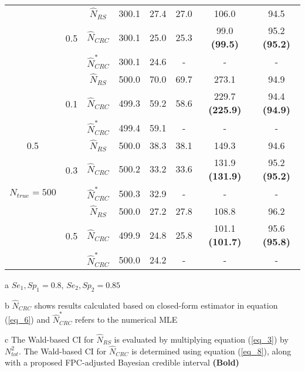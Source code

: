 \documentclass[useAMS,usenatbib,referee]{biom}
\begin{document}
\begin{table}
\begin{threeparttable}[b]
\begin{tabular}{|c|c|c|c|c|c|c|c|}
     & \multirow{3}{*}{0.5}  & $\hat{N}_{RS}$ & 300.1 & 27.4 & 27.0 & 106.0 & 94.5    \\ \cline{3-8}
     & ~ & $\hat{N}_{CRC}$ & 300.1 & 25.0 & 25.3 & 99.0 \textbf{(99.5)} & 95.2 \textbf{(95.2)}   \\ \cline{3-8}
    ~ & ~ & $\hat{N}_{CRC}^*$ & 300.1 & 24.6  & - & - & -   \\ \hline
    
    & \multirow{3}{*}{0.1} & $\hat{N}_{RS}$ & 500.0 & 70.0 & 69.7 & 273.1 & 94.9  \\ \cline{3-8}
     & ~ & $\hat{N}_{CRC}$ &  499.3 & 59.2 & 58.6 & 229.7 \textbf{(225.9)} & 94.4 \textbf{(94.9)}   \\ \cline{3-8}
    ~ & ~ & $\hat{N}_{CRC}^*$ & 499.4 & 59.1 & - & - & -   \\ \cline{2-8}
    
    0.5 & \multirow{3}{*}{0.3} & $\hat{N}_{RS}$ & 500.0 & 38.3 & 38.1 & 149.3 & 94.6   \\ \cline{3-8}
     & ~ & $\hat{N}_{CRC}$ &  500.2 & 33.2 & 33.6 & 131.9 \textbf{(131.9)} & 95.2 \textbf{(95.2)}  \\ \cline{3-8}
    $N_{true}=500$ & ~ & $\hat{N}_{CRC}^*$ & 500.3 & 32.9 & - & - & -   \\ \cline{2-8}
    
     & \multirow{3}{*}{0.5}  & $\hat{N}_{RS}$ & 500.0 & 27.2 & 27.8 & 108.8 & 96.2  \\ \cline{3-8}
     & ~ & $\hat{N}_{CRC}$ &  499.9 & 24.8 & 25.8 & 101.1 \textbf{(101.7)} & 95.6 \textbf{(95.8)}   \\ \cline{3-8}
    ~ & ~ & $\hat{N}_{CRC}^*$ &  500.0 & 24.2   & - & - & -   \\ \hline
    \end{tabular}
    \begin{tablenotes}
        \item[a] \footnotesize $Se_1, Sp_1=0.8$, $Se_2, Sp_2=0.85$
        \item[b] \footnotesize $\hat{N}_{CRC}$ shows results calculated based on closed-form estimator in equation (\ref{eq_6}) and $\hat{N}_{CRC}^*$ refers to the numerical MLE
        \item[c] The Wald-based CI for $\hat{N}_{RS}$ is evaluated by multiplying equation (\ref{eq_3}) by $N_{tot}^2$. The Wald-based CI for $\hat{N}_{CRC}$ is determined using equation (\ref{eq_8}), along with a proposed FPC-adjusted Bayesian credible interval \textbf{(Bold)}
  \end{tablenotes}
    \end{threeparttable}
\end{table}
\end{document}
